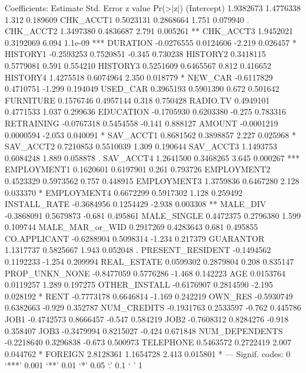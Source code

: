 \documentclass{article}
\begin{document}
\begin{Schunk}
\begin{Soutput}
Coefficients:
                   Estimate Std. Error z value Pr(>|z|)    
(Intercept)       1.9382673  1.4776338   1.312 0.189609    
CHK_ACCT1         0.5023131  0.2868664   1.751 0.079940 .  
CHK_ACCT2         1.3497380  0.4836687   2.791 0.005261 ** 
CHK_ACCT3         1.9452021  0.3192069   6.094  1.1e-09 ***
DURATION         -0.0276555  0.0124606  -2.219 0.026457 *  
HISTORY1         -0.2593253  0.7520851  -0.345 0.730238    
HISTORY2          0.3418115  0.5779081   0.591 0.554210    
HISTORY3          0.5251609  0.6465567   0.812 0.416652    
HISTORY4          1.4275518  0.6074964   2.350 0.018779 *  
NEW_CAR          -0.6117829  0.4710751  -1.299 0.194049    
USED_CAR          0.3965193  0.5901390   0.672 0.501642    
FURNITURE         0.1576746  0.4957144   0.318 0.750428    
RADIO.TV          0.4949101  0.4771533   1.037 0.299636    
EDUCATION        -0.1705930  0.6203380  -0.275 0.783316    
RETRAINING       -0.0767318  0.5454558  -0.141 0.888127    
AMOUNT           -0.0001219  0.0000594  -2.053 0.040091 *  
SAV_ACCT1         0.8681562  0.3898857   2.227 0.025968 *  
SAV_ACCT2         0.7210853  0.5510039   1.309 0.190644    
SAV_ACCT3         1.1493753  0.6084248   1.889 0.058878 .  
SAV_ACCT4         1.2641500  0.3468265   3.645 0.000267 ***
EMPLOYMENT1       0.1620601  0.6197901   0.261 0.793726    
EMPLOYMENT2       0.4523329  0.5973562   0.757 0.448915    
EMPLOYMENT3       1.3759836  0.6467280   2.128 0.033370 *  
EMPLOYMENT4       0.6672299  0.5917302   1.128 0.259492    
INSTALL_RATE     -0.3684956  0.1254429  -2.938 0.003308 ** 
MALE_DIV         -0.3868091  0.5679873  -0.681 0.495861    
MALE_SINGLE       0.4472375  0.2796380   1.599 0.109744    
MALE_MAR_or_WID   0.2917269  0.4283643   0.681 0.495855    
CO.APPLICANT     -0.6288904  0.5098314  -1.234 0.217379    
GUARANTOR         1.1317737  0.5825667   1.943 0.052048 .  
PRESENT_RESIDENT -0.1494562  0.1192233  -1.254 0.209994    
REAL_ESTATE       0.0599302  0.2879804   0.208 0.835147    
PROP_UNKN_NONE   -0.8477059  0.5776286  -1.468 0.142223    
AGE               0.0153764  0.0119257   1.289 0.197275    
OTHER_INSTALL    -0.6176907  0.2814590  -2.195 0.028192 *  
RENT             -0.7773178  0.6646814  -1.169 0.242219    
OWN_RES          -0.5930749  0.6382663  -0.929 0.352787    
NUM_CREDITS      -0.1931763  0.2533597  -0.762 0.445786    
JOB1             -0.4742573  0.8666457  -0.547 0.584219    
JOB2             -0.7608312  0.8284276  -0.918 0.358407    
JOB3             -0.3479994  0.8215027  -0.424 0.671848    
NUM_DEPENDENTS   -0.2218640  0.3296838  -0.673 0.500973    
TELEPHONE         0.5463572  0.2722419   2.007 0.044762 *  
FOREIGN           2.8128361  1.1654728   2.413 0.015801 *  
---
Signif. codes:  0 ‘***’ 0.001 ‘**’ 0.01 ‘*’ 0.05 ‘.’ 0.1 ‘ ’ 1


\end{Soutput}
\end{Schunk}
\end{document}
